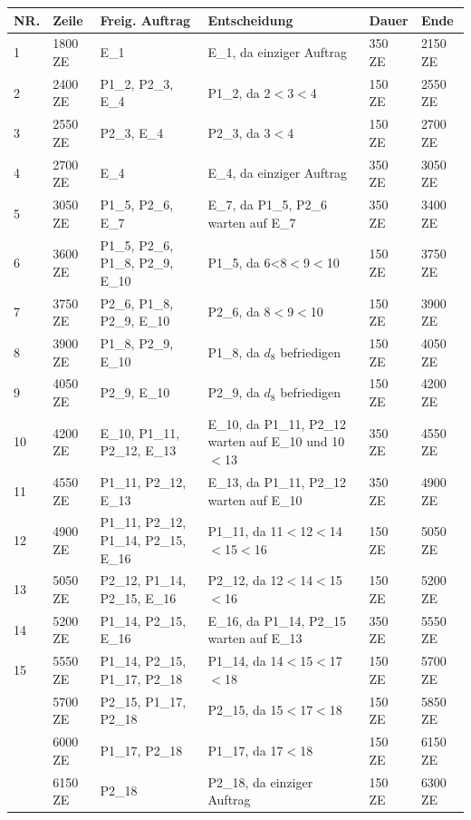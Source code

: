 		\begin{tabularx}{\linewidth}{|p{0.6cm}|p{}|>{\raggedright}p{}|>{\raggedright}p{5cm}|X|X|}
			\nobreakhline
			\caption{Beispieltabelle mit Umbruch und Wiederholen des Tabellenkopfes.} \endfoot
			\hline %
			NR. & Zeile & Freig. Auftrag  & Entscheidung & Dauer  & Ende  \\ \hline
			\endhead
			1 & 1800 ZE	& E\_1	& E\_1, da einziger Auftrag	& 350 ZE	& 2150 ZE\\
			2 & 2400 ZE	& P1\_2, P2\_3, E\_4	& P1\_2, da 2$<$3$<$4	& 150 ZE	& 2550 ZE\\
			3 & 2550 ZE	& P2\_3, E\_4	& P2\_3, da 3$<$4	& 150 ZE	& 2700 ZE\\
			4 & 2700 ZE	& E\_4	& E\_4, da einziger Auftrag	& 350 ZE	& 3050 ZE\\
			5 & 3050 ZE	& P1\_5, P2\_6, E\_7	& E\_7, da P1\_5, P2\_6 warten auf E\_7	& 350 ZE	& 3400 ZE\\
			6 & 3600 ZE	& P1\_5, P2\_6, P1\_8, P2\_9, E\_10	& P1\_5, da $6$<8$<$9$<$10	& 150 ZE	& 3750 ZE\\
			7 & 3750 ZE	& P2\_6, P1\_8, P2\_9, E\_10	& P2\_6, da 8$<$9$<$10	& 150 ZE	& 3900 ZE\\
			8 & 3900 ZE	& P1\_8, P2\_9, E\_10	& P1\_8, da $d_{8}$ befriedigen	& 150 ZE	& 4050 ZE\\
			9 & 4050 ZE	& P2\_9, E\_10	& P2\_9, da $d_{8}$ befriedigen	& 150 ZE	& 4200 ZE\\
			10 & 4200 ZE	& E\_10, P1\_11, P2\_12, E\_13	& E\_10, da P1\_11, P2\_12 warten auf E\_10 und 10$<$13	& 350 ZE	& 4550 ZE\\
			11 & 4550 ZE	& P1\_11, P2\_12, E\_13	& E\_13, da P1\_11, P2\_12 warten auf E\_10	& 350 ZE	& 4900 ZE\\
			12 & 4900 ZE	& P1\_11, P2\_12, P1\_14, P2\_15, E\_16	& P1\_11, da 11$<$12$<$14$<$15$<$16 	& 150 ZE	& 5050 ZE\\
			13 & 5050 ZE	& P2\_12, P1\_14, P2\_15, E\_16	& P2\_12, da 12$<$14$<$15$<$16 &	150 ZE	& 5200 ZE\\
			14 & 5200 ZE	& P1\_14, P2\_15, E\_16	& E\_16, da P1\_14, P2\_15 warten auf E\_13	& 350 ZE	& 5550 ZE\\
			15 & 5550 ZE	& P1\_14, P2\_15, P1\_17, P2\_18	& P1\_14, da 14$<$15$<$17$<$18 	& 150 ZE	& 5700 ZE\\ \nopagebreak
			16 & 5700 ZE	& P2\_15, P1\_17, P2\_18	& P2\_15, da 15$<$17$<$18	& 150 ZE	& 5850 ZE\\ \nopagebreak
			17 & 6000 ZE	& P1\_17, P2\_18	& P1\_17, da 17$<$18	& 150 ZE	& 6150 ZE\\ \nopagebreak
			18 & 6150 ZE	& P2\_18	& P2\_18, da einziger Auftrag	& 150 ZE	& 6300 ZE
			\label{tab:fifo_d6}
		\end{tabularx}

